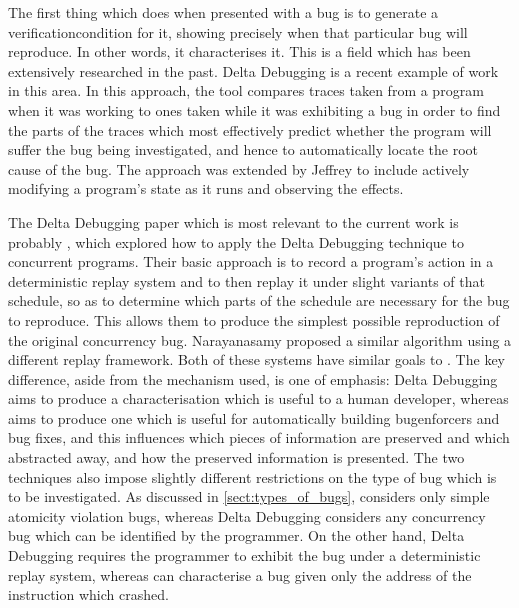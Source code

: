The first thing which {\technique} does when presented with a bug is
to generate a \gls{verificationcondition} for it, showing precisely
when that particular bug will reproduce.  In other words, it
characterises it.  This is a field which has been extensively
researched in the past.  Delta Debugging\cite{Cleve2005} is a recent
example of work in this area.  In this approach, the
tool compares traces taken from a program when it was working to ones
taken while it was exhibiting a bug in order to find the parts of the
traces which most effectively predict whether the program will suffer
the bug being investigated, and hence to automatically locate the root
cause of the bug.  The approach was extended by
Jeffrey\cite{Jeffrey2009} to include actively modifying a program's
state as it runs and observing the effects.

The Delta Debugging paper which is most relevant to the current work
is probably \cite{Choi2002}, which explored how to
apply the Delta Debugging technique to concurrent programs.  Their
basic approach is to record a program's action in a deterministic
replay system and to then replay it under slight variants of that
schedule, so as to determine which parts of the schedule are necessary
for the bug to reproduce.  This allows them to produce the simplest
possible reproduction of the original concurrency bug.
Narayanasamy\cite{Narayanasamy2007} proposed a similar algorithm using
a different replay framework.  Both of these systems have similar
goals to {\technique}.  The key difference, aside from the mechanism
used, is one of emphasis: Delta Debugging aims to produce a
characterisation which is useful to a human developer, whereas
{\technique} aims to produce one which is useful for automatically
building \glspl{bugenforcer} and bug fixes, and this influences which
pieces of information are preserved and which abstracted away, and how
the preserved information is presented.  The two techniques also
impose slightly different restrictions on the type of bug which is to
be investigated.  As discussed in \autoref{sect:types_of_bugs},
{\technique} considers only simple atomicity violation bugs, whereas
Delta Debugging considers any concurrency bug which can be identified
by the programmer.  On the other hand, Delta Debugging requires the
programmer to exhibit the bug under a deterministic replay system,
whereas {\technique} can characterise a bug given only the address of
the instruction which crashed.

